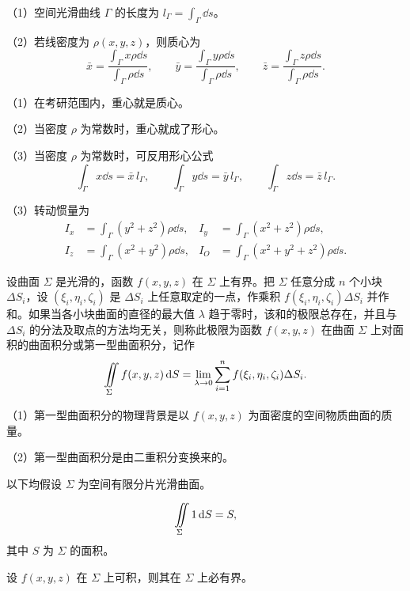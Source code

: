 
（1）空间光滑曲线 $\Gamma$ 的长度为 $l_{\Gamma}=\int_{\Gamma}\dd s$。

（2）若线密度为 $\rho(x,y,z)$，则质心为
\[
\bar x=\frac{\int_{\Gamma}x\rho\dd s}{\int_{\Gamma}\rho\dd s},\qquad
\bar y=\frac{\int_{\Gamma}y\rho\dd s}{\int_{\Gamma}\rho\dd s},\qquad
\bar z=\frac{\int_{\Gamma}z\rho\dd s}{\int_{\Gamma}\rho\dd s}.
\]
\begin{notebox}
（1）在考研范围内，重心就是质心。

（2）当密度 $\rho$ 为常数时，重心就成了形心。

（3）当密度 $\rho$ 为常数时，可反用形心公式
\[
\int_{\Gamma}x\dd s=\bar x\,l_{\Gamma},\qquad
\int_{\Gamma}y\dd s=\bar y\,l_{\Gamma},\qquad
\int_{\Gamma}z\dd s=\bar z\,l_{\Gamma}.
\]
\end{notebox}

（3）转动惯量为
\begin{align*}
I_x&=\int_{\Gamma}(y^2+z^2)\rho\dd s,&
I_y&=\int_{\Gamma}(x^2+z^2)\rho\dd s,\\
I_z&=\int_{\Gamma}(x^2+y^2)\rho\dd s,&
I_O&=\int_{\Gamma}(x^2+y^2+z^2)\rho\dd s.
\end{align*}



设曲面 $\Sigma$ 是光滑的，函数 $f(x,y,z)$ 在 $\Sigma$ 上有界。把 $\Sigma$ 任意分成 $n$ 个小块 $\Delta S_i$，设 $(\xi_i,\eta_i,\zeta_i)$ 是 $\Delta S_i$ 上任意取定的一点，作乘积 $f(\xi_i,\eta_i,\zeta_i)\Delta S_i$ 并作和。如果当各小块曲面的直径的最大值 $\lambda$ 趋于零时，该和的极限总存在，并且与 $\Delta S_i$ 的分法及取点的方法均无关，则称此极限为函数 $f(x,y,z)$ 在曲面 $\Sigma$ 上对面积的曲面积分或第一型曲面积分，记作
\[
\iint\limits_{\Sigma} f(x,y,z)\mathop{}\!\mathrm d S
=\lim_{\lambda\to0}\sum_{i=1}^{n}f(\xi_i,\eta_i,\zeta_i)\Delta S_i.
\]

\begin{notebox}
（1）第一型曲面积分的物理背景是以 $f(x,y,z)$ 为面密度的空间物质曲面的质量。

（2）第一型曲面积分是由二重积分变换来的。
\end{notebox}


以下均假设 $\Sigma$ 为空间有限分片光滑曲面。

\[
\iint\limits_{\Sigma}1\mathop{}\!\mathrm d S=S,
\]
其中 $S$ 为 $\Sigma$ 的面积。

设 $f(x,y,z)$ 在 $\Sigma$ 上可积，则其在 $\Sigma$ 上必有界。


